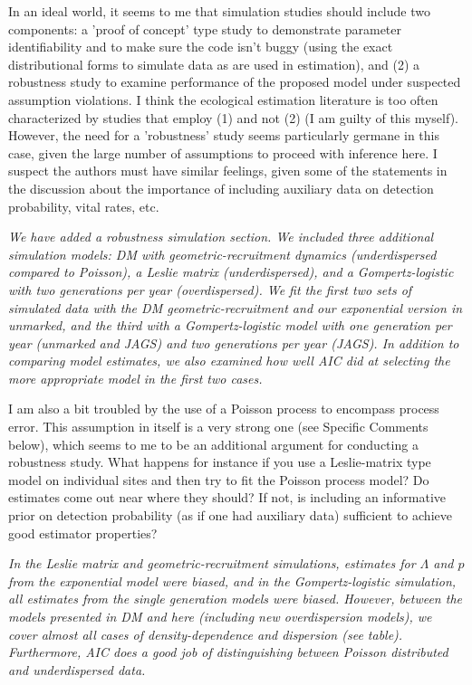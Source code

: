 \documentclass[12pt,english]{article}
\begin{document}
\begin{spacing}{1.9}
\begin{flushleft}
In an ideal world, it seems to me that simulation studies should include two components: a 
'proof of concept' type study to demonstrate parameter identifiability and to make sure the code 
isn't buggy (using the exact distributional forms to simulate data as are used in estimation), and 
(2) a robustness study to examine performance of the proposed model under suspected assumption 
violations. I think the ecological estimation literature is too often characterized by studies that 
employ (1) and not (2) (I am guilty of this myself). However, the need for a 'robustness' study seems 
particularly germane in this case, given the large number of assumptions to proceed with inference here. 
I suspect the authors must have similar feelings, given some of the statements in the discussion about 
the importance of including auxiliary data on detection probability, vital rates, etc.

\vspace{0.5cm}
\textit{We have added a robustness simulation section. We included three additional simulation models:
DM with geometric-recruitment dynamics (underdispersed compared to Poisson), a Leslie matrix (underdispersed),
and a Gompertz-logistic with two generations per year (overdispersed). We fit the first two sets of simulated
data with the DM geometric-recruitment and our exponential version in unmarked, and the third with
a Gompertz-logistic model with one generation per year (unmarked and JAGS) and two generations
per year (JAGS).  In addition to comparing model estimates, we also examined how well AIC did at
selecting the more appropriate model in the first two cases.}
\vspace{0.5cm}

I am also a bit troubled by the use of a Poisson process to encompass process error. This assumption 
in itself is a very strong one (see Specific Comments below), which seems to me to be an additional 
argument for conducting a robustness study. What happens for instance if you use a Leslie-matrix 
type model on individual sites and then try to fit the Poisson process model? Do estimates come out 
near where they should? If not, is including an informative prior on detection probability (as if one 
had auxiliary data) sufficient to achieve good estimator properties?

\vspace{0.5cm}
\textit{In the Leslie matrix and geometric-recruitment simulations, estimates for $\Lambda$ and $p$ from
the exponential model were biased, and in the Gompertz-logistic simulation, all estimates from the single
generation models were biased.  However, between the models presented in DM and here (including new 
overdispersion models), we cover almost
all cases of density-dependence and dispersion (see table).  Furthermore, AIC does a good job of distinguishing
between Poisson distributed and underdispersed data.}
\vspace{0.5cm}


\end{flushleft}
\end{spacing}
\end{document}
